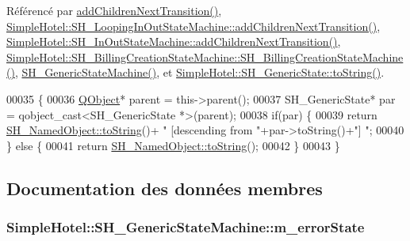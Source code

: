 Référencé par \hyperlink{classSimpleHotel_1_1SH__GenericStateMachine_a3771c91002bec6ab9414703251cc7825}{add\-Children\-Next\-Transition()}, \hyperlink{classSimpleHotel_1_1SH__LoopingInOutStateMachine_a2ac2ff43d97fd1b12e1b30d6818f33e4}{Simple\-Hotel\-::\-S\-H\-\_\-\-Looping\-In\-Out\-State\-Machine\-::add\-Children\-Next\-Transition()}, \hyperlink{classSimpleHotel_1_1SH__InOutStateMachine_aaf5afe04d6e4d3d5ebf0b5f1b00eddf1}{Simple\-Hotel\-::\-S\-H\-\_\-\-In\-Out\-State\-Machine\-::add\-Children\-Next\-Transition()}, \hyperlink{classSimpleHotel_1_1SH__BillingCreationStateMachine_a8c7d39e11d0ced1fd9c27a5550465b86}{Simple\-Hotel\-::\-S\-H\-\_\-\-Billing\-Creation\-State\-Machine\-::\-S\-H\-\_\-\-Billing\-Creation\-State\-Machine()}, \hyperlink{classSimpleHotel_1_1SH__GenericStateMachine_a0943c733abdbe70ea78f9e1f90a26154}{S\-H\-\_\-\-Generic\-State\-Machine()}, et \hyperlink{classSimpleHotel_1_1SH__GenericState_adaded78178f9999a9e07a32871af5e61}{Simple\-Hotel\-::\-S\-H\-\_\-\-Generic\-State\-::to\-String()}.


\begin{DoxyCode}
00035 \{
00036     \hyperlink{classQObject}{QObject}* parent = this->parent();
00037     SH\_GenericState* par = qobject\_cast<SH\_GenericState *>(parent);
00038     \textcolor{keywordflow}{if}(par) \{
00039         \textcolor{keywordflow}{return} \hyperlink{classSimpleHotel_1_1SH__NamedObject_ab6e289aeff50c3fb0f30156c68b1e808}{SH\_NamedObject::toString}()+ \textcolor{stringliteral}{" [descending from "}+par->toString()+\textcolor{stringliteral}{"] 
      "};
00040     \} \textcolor{keywordflow}{else} \{
00041         \textcolor{keywordflow}{return} \hyperlink{classSimpleHotel_1_1SH__NamedObject_ab6e289aeff50c3fb0f30156c68b1e808}{SH\_NamedObject::toString}();
00042     \}
00043 \}
\end{DoxyCode}


\subsection{Documentation des données membres}
\hypertarget{classSimpleHotel_1_1SH__GenericStateMachine_af80b97874f58dfc58f48021dd6cb24eb}{
\subsubsection[{m\-\_\-error\-State}]{\setlength{\rightskip}{0pt plus 5cm}Simple\-Hotel\-::\-S\-H\-\_\-\-Generic\-State\-Machine\-::m\-\_\-error\-State\hspace{0.3cm}{\ttfamily [private]}}}\label{classSimpleHotel_1_1SH__GenericStateMachine_af80b97874f58dfc58f48021dd6cb24eb}


